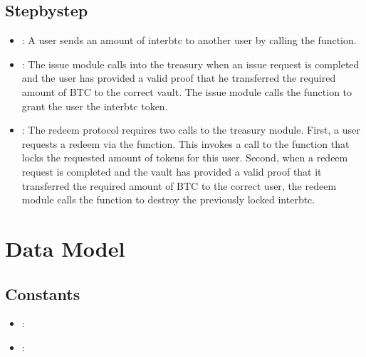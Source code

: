 \documentclass[a4paper,10pt,english]{sphinxmanual}
\begin{document}
\subsection{Step\sphinxhyphen{}by\sphinxhyphen{}step}
\label{\detokenize{spec/treasury:step-by-step}}\begin{itemize}
\item {} 
: A user sends an amount of interbtc to another user by calling the {\hyperref[\detokenize{spec/treasury:transfer}]{}} function.

\item {} 
: The issue module calls into the treasury when an issue request is completed and the user has provided a valid proof that he transferred the required amount of BTC to the correct vault. The issue module calls the {\hyperref[\detokenize{spec/treasury:mint}]{}} function to grant the user the interbtc token.

\item {} 
: The redeem protocol requires two calls to the treasury module. First, a user requests a redeem via the {\hyperref[\detokenize{spec/redeem:requestredeem}]{}} function. This invokes a call to the {\hyperref[\detokenize{spec/treasury:lock}]{}} function that locks the requested amount of tokens for this user. Second, when a redeem request is completed and the vault has provided a valid proof that it transferred the required amount of BTC to the correct user, the redeem module calls the {\hyperref[\detokenize{spec/treasury:burn}]{}} function to destroy the previously locked interbtc.

\end{itemize}


\section{Data Model}
\label{\detokenize{spec/treasury:data-model}}

\subsection{Constants}
\label{\detokenize{spec/treasury:constants}}\begin{itemize}
\item {} 
: 

\item {} 
: 

\end{itemize}
\end{document}

